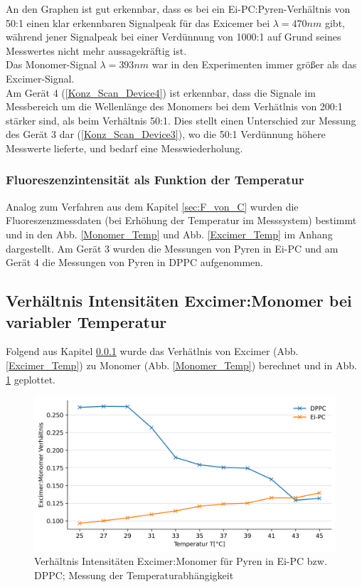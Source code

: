 An den Graphen ist gut erkennbar, dass es bei ein Ei-PC:Pyren-Verhältnis von 50:1 einen klar erkennbaren Signalpeak für 
das Exicemer bei $\lambda = 470nm$ gibt, während jener Signalpeak bei einer Verdünnung von 1000:1 auf Grund seines Messwertes
nicht mehr aussagekräftig ist. \\
Das Monomer-Signal $\lambda=393nm$ war in den Experimenten immer größer als das Excimer-Signal.\\
Am Gerät 4 (\ref{Konz_Scan_Device4}) ist erkennbar, dass die Signale im Messbereich um die Wellenlänge des Monomers 
 bei dem Verhätlnis von 200:1 stärker sind, als beim Verhältnis 50:1. Dies stellt einen Unterschied 
zur Messung des Gerät 3 dar (\ref{Konz_Scan_Device3}), wo die 50:1 Verdünnung höhere Messwerte lieferte, und bedarf eine Messwiederholung.


\subsubsection{Fluoreszenzintensität als Funktion der Temperatur} \label{sec:FvonT}

Analog zum Verfahren aus dem Kapitel \ref{sec:F_von_C} wurden die Fluoreszenzmessdaten (bei Erhöhung der Temperatur 
im Messsystem) bestimmt und in den Abb. \ref{Monomer_Temp} und Abb. \ref{Excimer_Temp} im Anhang dargestellt.
Am Gerät 3 wurden die Messungen von Pyren in Ei-PC und am Gerät 4 die Messungen von Pyren in DPPC aufgenommen.

\subsection{Verhältnis Intensitäten Excimer:Monomer bei variabler Temperatur}\label{sec:Ex_Mono}
Folgend aus Kapitel \ref{sec:FvonT} wurde das Verhätlnis von Excimer (Abb. \ref{Excimer_Temp}) zu 
Monomer (Abb. \ref{Monomer_Temp}) berechnet und in Abb. \ref{Ex_Mono} geplottet.

\begin{figure}[h!]
	\begin{center}
		\begin{minipage}{0,8\textwidth}
			
			\includegraphics[width=\textwidth]{analysis/reports/Ex-Mono.png}
			\caption{Verhältnis Intensitäten Excimer:Monomer für Pyren in Ei-PC bzw. DPPC; Messung der Temperaturabhängigkeit} 
			\label{Ex_Mono} 
		\end{minipage}
	\end{center}
\end{figure}

